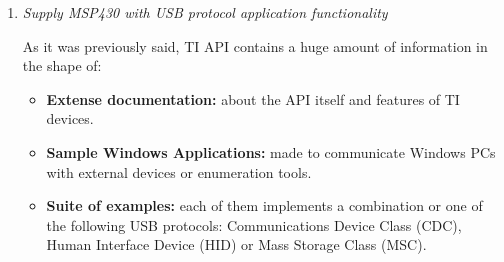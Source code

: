 		\begin{enumerate}
			\item \emph{Supply MSP430 with USB protocol application functionality}\\
				\begin{comment}
				This API contains any simple aplications for windows, to comunicate by certain protocols with 
				external devices or enumeration tools; an extense documentation about the API and about the USB 
				characteristics of its devices; and a huge suite of examples that implements a lot of USB protocols 
				to comunicate the MSP430 whith windows such as Communications Device Class (CDC), Personal Healthcare 
				Device Class (PHDC), Human Interface Device (HID) in traditional and datatype implementations, Mass 
				Storage Class (MSC) and combinations of any of them. At this point we have an inmense amount of information 
				and we don't really know what can be usefull for us.\\
				
				After a good time of investigation we found that it can't initialize a certain clock, this clock 
				don't seems to be in the board and we there are not much references about it. Finally we found a 
				little paragraph in one API document that metion the chance of a USB needed clock was not included 
				in any kind of boards and a recomendation of how should be this clock, when we buy a clock of this 
				features we can check that this was the problems, the TI example finally works.

				All this tetst was carried out in a virtual machine with windows usually running over other windows, 
				but in a casual situation when this virtual machine was running over ubuntu we discover that this examples 
				not only don't work in ubuntu, somthing that we assume, but in addition ubuntu can't even detect our MSP430, 
				this fact worry us because android is an UNIX based SO just like ubuntu. \\
				\end{comment}
				
				As it was previously said, TI API contains a huge amount of information in the shape of:
				\begin{itemize}
					\item \textbf{Extense documentation:} about the API itself and features of TI devices. 
					\item \textbf{Sample Windows Applications:} made to communicate Windows PCs with external devices or
						enumeration tools.
					\item \textbf{Suite of examples:} each of them implements a combination or one of the following
						USB protocols: Communications Device Class (CDC), Human Interface Device (HID) or Mass Storage Class (MSC).
				\end{itemize}
				

\end{enumerate}
